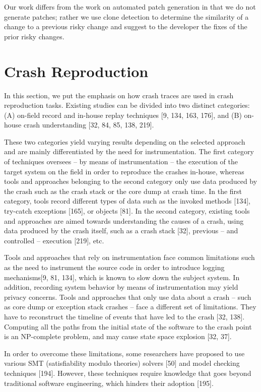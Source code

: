 \documentclass[12pt]{report}
\begin{document}
Our work differs from the work on automated patch generation in that we
do not generate patches; rather we use clone detection to determine the
similarity of a change to a previous risky change and suggest to the
developer the fixes of the prior risky changes.

\section{Crash Reproduction}\label{crash-reproduction}

In this section, we put the emphasis on how crash traces are used in
crash reproduction tasks. Existing studies can be divided into two
distinct categories: (A) on-field record and in-house replay techniques
{[}9, 134, 163, 176{]}, and (B) on-house crash understanding {[}32, 84,
85, 138, 219{]}.

These two categories yield varying results depending on the selected
approach and are mainly differentiated by the need for instrumentation.
The first category of techniques oversees -- by means of instrumentation
-- the execution of the target system on the field in order to reproduce
the crashes in-house, whereas tools and approaches belonging to the
second category only use data produced by the crash such as the crash
stack or the core dump at crash time. In the first category, tools
record different types of data such as the invoked methods {[}134{]},
try-catch exceptions {[}165{]}, or objects {[}81{]}. In the second
category, existing tools and approaches are aimed towards understanding
the causes of a crash, using data produced by the crash itself, such as
a crash stack {[}32{]}, previous -- and controlled -- execution
{[}219{]}, etc.

Tools and approaches that rely on instrumentation face common
limitations such as the need to instrument the source code in order to
introduce logging mechanisms{[}9, 81, 134{]}, which is known to slow
down the subject system. In addition, recording system behavior by means
of instrumentation may yield privacy concerns. Tools and approaches that
only use data about a crash -- such as core dump or exception stack
crashes -- face a different set of limitations. They have to reconstruct
the timeline of events that have led to the crash {[}32, 138{]}.
Computing all the paths from the initial state of the software to the
crash point is an NP-complete problem, and may cause state space
explosion {[}32, 37{]}.

In order to overcome these limitations, some researchers have proposed
to use various SMT (satisfiability modulo theories) solvers {[}50{]} and
model checking techniques {[}194{]}. However, these techniques require
knowledge that goes beyond traditional software engineering, which
hinders their adoption {[}195{]}.
\end{document}
